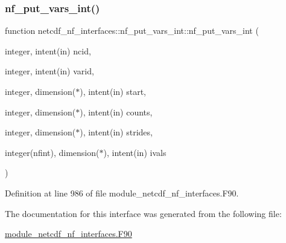 \subsubsection{\texorpdfstring{nf\+\_\+put\+\_\+vars\+\_\+int()}{nf\_put\_vars\_int()}}
{\footnotesize\ttfamily function netcdf\+\_\+nf\+\_\+interfaces\+::nf\+\_\+put\+\_\+vars\+\_\+int\+::nf\+\_\+put\+\_\+vars\+\_\+int (\begin{DoxyParamCaption}\item[{integer, intent(in)}]{ncid,  }\item[{integer, intent(in)}]{varid,  }\item[{integer, dimension($\ast$), intent(in)}]{start,  }\item[{integer, dimension($\ast$), intent(in)}]{counts,  }\item[{integer, dimension($\ast$), intent(in)}]{strides,  }\item[{integer(nfint), dimension($\ast$), intent(in)}]{ivals }\end{DoxyParamCaption})}



Definition at line 986 of file module\+\_\+netcdf\+\_\+nf\+\_\+interfaces.\+F90.



The documentation for this interface was generated from the following file\+:\begin{DoxyCompactItemize}
\item 
\hyperlink{module__netcdf__nf__interfaces_8F90}{module\+\_\+netcdf\+\_\+nf\+\_\+interfaces.\+F90}\end{DoxyCompactItemize}
